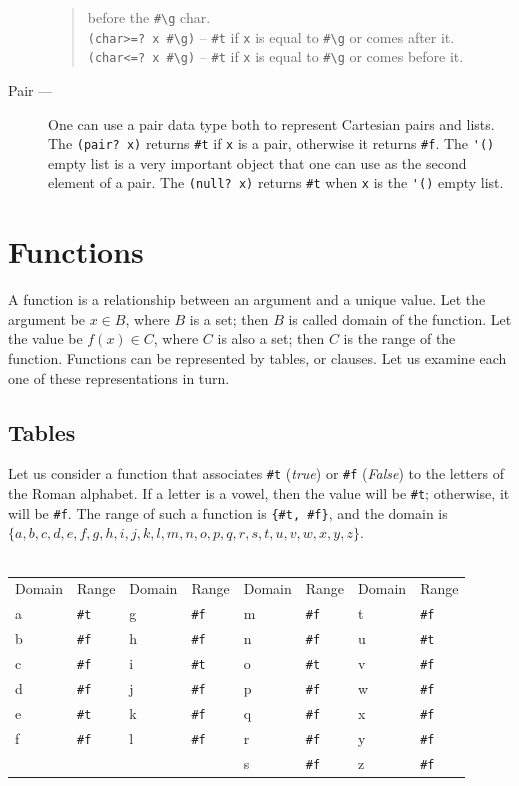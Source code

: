 \documentclass[a4paper,12pt]{book}
\begin{document}
\begin{description}
\begin{quote}
  before the \verb|#\g| char.\\
  \verb|(char>=? x #\g)| -- \verb|#t| if \verb|x| is
  equal to \verb|#\g| or comes after it.\\
  \verb|(char<=? x #\g)| -- \verb|#t| if \verb|x| is
  equal to \verb|#\g| or comes before it.\\
\end{quote}
\item[Pair ---] One can use a pair data type
  both to represent Cartesian pairs and lists.
  The \verb|(pair? x)| returns \verb|#t| if
  \verb|x| is a pair, otherwise it returns \verb|#f|.
  The \verb|'()| empty list is a very important
  object that one can use as the second element
  of a pair. The \verb|(null? x)| returns \verb|#t|
  when \verb|x| is the \verb|'()| empty list.
\end{description}


\section{Functions}
A function is a relationship between an argument and a unique value.
Let the argument be $x\in B$, where $B$ is a set; then $B$ is called
domain of the function. Let the value be $f(x)\in C$, where $C$ is
also a set; then $C$ is the range of the function.
Functions can be represented by tables, or clauses. Let us examine
each one of these representations in turn.

\subsection*{Tables}
Let us consider a function that associates \verb|#t| ({\em true})
 or \verb|#f| ({\em False}) to the
letters of the Roman alphabet. If a letter is a vowel,
 then the value will be \verb|#t|; otherwise, 
it will be \verb|#f|. The range of such a function
is \verb|{#t, #f}|, and the domain is
$\{a,b,c,d,e,f,g,h,i,j,k,l,m,n,o,p,q,r,s,t,u,v,w,x,y,z\}$.\\

\verb||\\
{\footnotesize
\begin{tabular}{|p{1.2cm} p{1.2cm} | p{1.2cm} p{1.2cm} |p{1.2cm} p{1.2cm} | p{1.2cm} p{1.2cm} |}
Domain & Range & Domain & Range & Domain & Range & Domain & Range\\
a & \verb|#t| & g &\verb|#f| & m &\verb|#f| & t & \verb|#f| \\
b & \verb|#f| & h &\verb|#f| & n & \verb|#f| & u & \verb|#t| \\
c & \verb|#f| &  i &\verb|#t| &o &\verb|#t| & v & \verb|#f|\\
d &\verb|#f| &  j & \verb|#f| & p & \verb|#f| & w & \verb|#f| \\
e &\verb|#t| & k & \verb|#f| & q & \verb|#f| & x & \verb|#f| \\
f &\verb|#f| &  l &\verb|#f| & r & \verb|#f| & y & \verb|#f| \\
  &            &                 &  & s & \verb|#f| & z & \verb|#f|\\
\end{tabular}}
\end{document}
